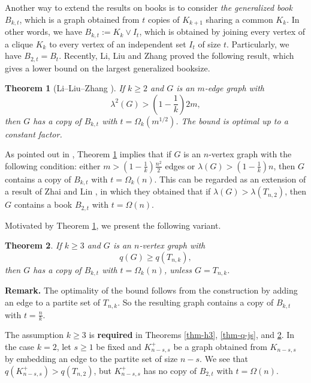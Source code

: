 \documentclass[11pt,a4paper]{article}
\theoremstyle{plain}
\newtheorem{theorem}{Theorem}[section]
\theoremstyle{definition}
\begin{document}
Another way to extend the results on books is to 
consider {\it the generalized book} $B_{k,t}$, which 
is a graph obtained from $t$ copies of 
$K_{k+1}$ sharing a common $K_k$. 
In other words, we have $B_{k,t}:=K_k\vee I_t$, which is obtained by joining every vertex of a clique $K_k$ to every vertex of an independent set $I_t$ of size $t$. Particularly, we have $B_{2,t}=B_t$. Recently, 
Li, Liu and Zhang \cite{LLZ2024-book-4-cycle} proved the following result, which gives a lower bound on the largest generalized booksize. 


\begin{theorem}[Li--Liu--Zhang \cite{LLZ2024-book-4-cycle}] \label{thm-LLZ2024}
If $k\ge 2$ and $G$ is an $m$-edge graph with 
\[ \lambda^2(G) > \left(1 - \frac{1}{k} \right)  2m, \]  
then $G$ has a copy of $B_{k, t}$ with $t = \Omega_k({m}^{1/2})$. The bound is optimal up to a constant factor. 
    \end{theorem}
    
As pointed out in \cite{LLZ2024-book-4-cycle}, 
Theorem \ref{thm-LLZ2024} implies that if $G$ is an $n$-vertex graph with the following condition: 
either $m> (1-\frac{1}{k})\frac{n^2}{2}$ edges or 
$\lambda (G)> (1-\frac{1}{k})n$, 
then $G$ contains a copy of $B_{k,t}$ 
with $t=\Omega_k(n)$. This can be regarded as an extension of a result of Zhai and Lin \cite{ZL2022jgt}, in which they obtained that if $\lambda (G) > \lambda (T_{n,2})$, then $G$ contains a book $B_{2,t}$ with $t=\Omega(n)$. 

 
Motivated by Theorem \ref{thm-LLZ2024}, we present the following variant. 


\begin{theorem} \label{thm-genelized-books}
If $k\ge 3$ and $G$ is an $n$-vertex graph with 
\[ q(G) \ge q(T_{n,k}), \] 
then $G$ has a copy of $B_{k,t}$ with $t= \Omega_k (n)$, unless $G=T_{n,k}$. 
\end{theorem}
 



\noindent 
{\bf Remark.} 
 The optimality of the bound follows from 
 the construction by adding an edge to a partite set of $T_{n,k}$. So the resulting graph contains a copy of $B_{k,t}$ with $t=\frac{n}{k}$. 

 
The assumption $k\ge 3$ is {\bf required} in Theorems \ref{thm-h3}, \ref{thm-q-js}, and \ref{thm-genelized-books}.
In the case $k=2$, let $s\ge 1$ be fixed and $K_{n-s,s}^+$ be a graph obtained from $K_{n-s,s}$ by embedding an edge to the partite set of size $n-s$. We see that $q(K_{n-s,s}^+) > q(T_{n,2})$, but $K_{n-s,s}^+$ has no copy of $B_{2,t}$ with $t=\Omega (n)$. 
\end{document}
